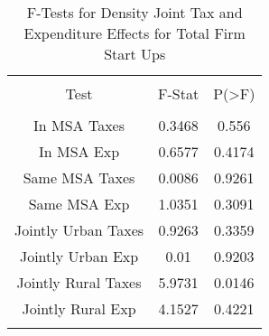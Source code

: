 
\begin{table}[!htbp] \centering 
  \caption{F-Tests for Density Joint Tax and Expenditure Effects for Total Firm Start Ups} 
  \label{--Ftests} 
\begin{tabular}{@{\extracolsep{5pt}} ccc} 
\\[-1.8ex]\hline 
\hline \\[-1.8ex] 
Test & F-Stat & P(\textgreater F) \\ 
\hline \\[-1.8ex] 
In MSA Taxes & 0.3468 & 0.556 \\ 
In MSA Exp & 0.6577 & 0.4174 \\ 
Same MSA Taxes & 0.0086 & 0.9261 \\ 
Same MSA Exp & 1.0351 & 0.3091 \\ 
Jointly Urban Taxes & 0.9263 & 0.3359 \\ 
Jointly Urban Exp & 0.01 & 0.9203 \\ 
Jointly Rural Taxes & 5.9731 & 0.0146 \\ 
Jointly Rural Exp & 4.1527 & 0.4221 \\ 
\hline \\[-1.8ex] 
\end{tabular} 
\end{table} 
